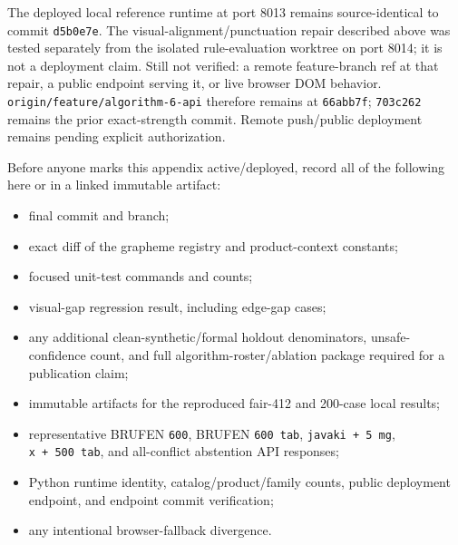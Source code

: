 The deployed local reference runtime at port 8013 remains source-identical to
commit \texttt{d5b0e7e}. The visual-alignment/punctuation repair described above was
tested separately from the isolated rule-evaluation worktree on port 8014; it
is not a deployment claim. Still not verified: a remote feature-branch ref at
that repair, a public endpoint serving it, or live browser DOM behavior.
\texttt{origin/feature/algorithm-6-api} therefore remains at \texttt{66abb7f}; \texttt{703c262}
remains the prior exact-strength commit. Remote push/public deployment remains
pending explicit authorization.

Before anyone marks this appendix active/deployed, record all of the following here or in a linked immutable artifact:

\begin{itemize}
\tightlist
\item
  final commit and branch;
\item
  exact diff of the grapheme registry and product-context constants;
\item
  focused unit-test commands and counts;
\item
  visual-gap regression result, including edge-gap cases;
\item
  any additional clean-synthetic/formal holdout denominators, unsafe-confidence count, and full algorithm-roster/ablation package required for a publication claim;
\item
  immutable artifacts for the reproduced fair-412 and 200-case local results;
\item
  representative BRUFEN \texttt{600}, BRUFEN \texttt{600\ tab}, \texttt{javaki\ +\ 5\ mg}, \texttt{x\ +\ 500\ tab}, and all-conflict abstention API responses;
\item
  Python runtime identity, catalog/product/family counts, public deployment endpoint, and endpoint commit verification;
\item
  any intentional browser-fallback divergence.
\end{itemize}
